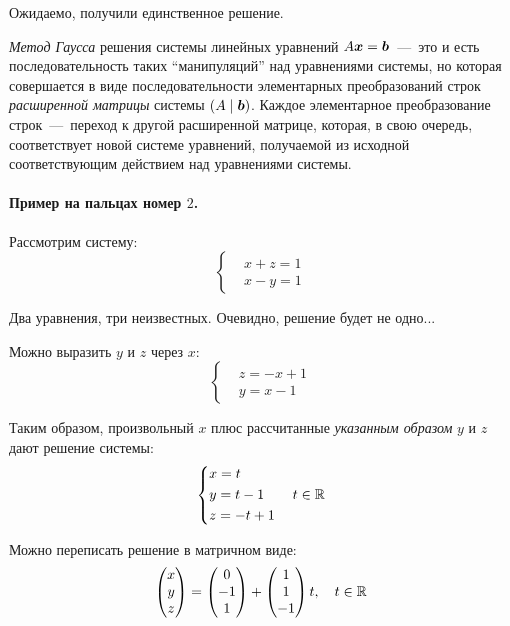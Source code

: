 \documentclass[a4paper,12pt]{article}
\begin{document}
  Ожидаемо, получили единственное решение.
  
  \emph{Метод Гаусса} решения системы линейных уравнений $A \bds x \hm= \bds b$~---~это и есть последовательность таких ``манипуляций'' над уравнениями системы, но которая совершается в виде последовательности элементарных преобразований строк \emph{расширенной матрицы} системы $(A \mid \boldsymbol b)$.
  Каждое элементарное преобразование строк~---~переход к другой расширенной матрице, которая, в свою очередь, соответствует новой системе уравнений, получаемой из исходной соответствующим действием над уравнениями системы.
  
  
  \bigskip
  
  \paragraph{Пример на пальцах номер $2$.}
  
  Рассмотрим систему:
  \[
    \left\{ \begin{aligned}
      &x + z = 1\\
      &x - y = 1
    \end{aligned} \right.
  \]
  
  Два уравнения, три неизвестных.
  Очевидно, решение будет не одно...
  
  Можно выразить $y$ и $z$ через $x$:
  \[
    \left\{ \begin{aligned}
      &z = -x + 1\\
      &y = x - 1
    \end{aligned} \right.
  \]
  
  Таким образом, произвольный $x$ плюс рассчитанные \emph{указанным образом} $y$ и $z$ дают решение системы:
  \[
    \left\{ \begin{aligned}
      &x = t\\
      &y = t - 1\\
      &z = -t + 1
    \end{aligned} \right. \quad t \in \operatorname{\mathbb R}
  \]
  
  Можно переписать решение в матричном виде:
  \[
    \begin{pmatrix} x \\ y \\ z\end{pmatrix} = \begin{pmatrix} 0 \\ -1 \\ 1\end{pmatrix} + \begin{pmatrix} 1 \\ 1 \\ -1\end{pmatrix} t, \quad t \in \operatorname{\mathbb R}
  \]
  
\end{document}
